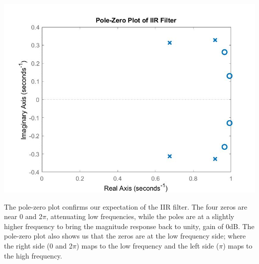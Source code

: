 \documentclass{article}
\begin{document}
        \begin{center}
            \includegraphics[width=\textwidth]{task6vera.jpg}
        \end{center}
        The pole-zero plot confirms our expectation of the IIR filter. The four zeros are near 0 and 2$\pi$, attenuating low frequencies, while the poles are at a slightly higher frequency to bring the magnitude response back to unity, gain of 0dB. The pole-zero plot also shows us that the zeros are at the low frequency side; where the right side (0 and 2$\pi$) maps to the low frequency and the left side ($\pi$) maps to the high frequency.
    
\end{document}
